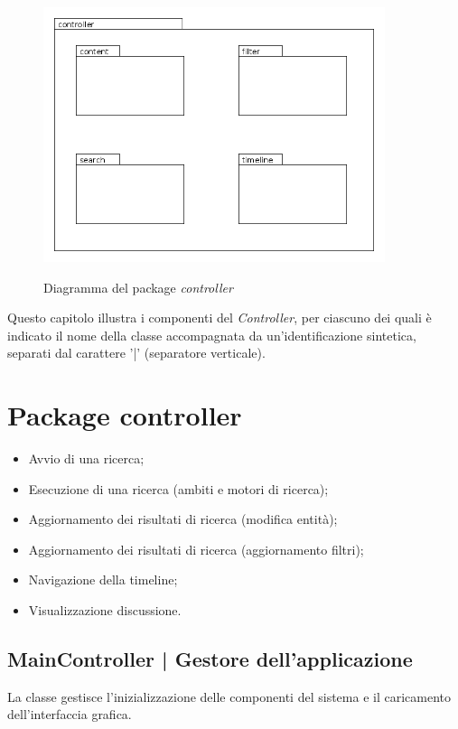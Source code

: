 \documentclass[10pt,a4paper,headinclude,footinclude,hidelinks]{scrreprt} %
\begin{document}
	\begin{figure}[ht]
		\begin{center}
	    	\includegraphics[width=10cm]{package/controller.png}
			\label{gfx:package:controller}
			\caption{Diagramma del package \textit{controller}}
		\end{center}
	\end{figure}

	Questo capitolo illustra i componenti del \textit{Controller}, per ciascuno dei quali è indicato il nome della classe accompagnata da un'identificazione sintetica, separati dal carattere '|' (separatore verticale).

	\section{Package controller}
	\label{sec:stage:design:controller}

	\begin{itemize}
	\item Avvio di una ricerca;
	\item Esecuzione di una ricerca (ambiti e motori di ricerca);
	\item Aggiornamento dei risultati di ricerca (modifica entità);
	\item Aggiornamento dei risultati di ricerca (aggiornamento filtri);
	\item Navigazione della timeline;
	\item Visualizzazione discussione.
	\end{itemize}

	\subsection[MainController]{MainController | Gestore dell'applicazione}
	\label{sec:stage:design:controller:main-controller}
	La classe \textit{} gestisce l'inizializzazione delle componenti del sistema e il caricamento dell'interfaccia grafica.
\end{document}
